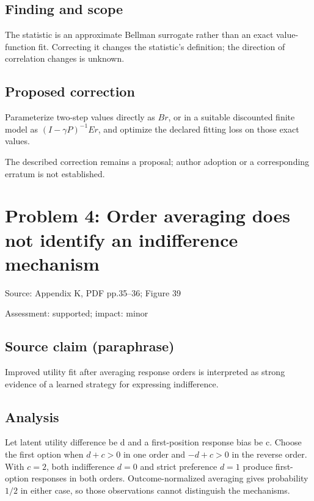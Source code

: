 \documentclass[11pt]{article}
\begin{document}
\subsection*{Finding and scope}

The statistic is an approximate Bellman surrogate rather than an exact value-function fit. Correcting it changes the statistic’s definition; the direction of correlation changes is unknown.

\subsection*{Proposed correction}

Parameterize two-step values directly as \(Br\), or in a suitable discounted finite model as \((I-\gamma P)^{-1}Er\), and optimize the declared fitting loss on those exact values.

The described correction remains a proposal; author adoption or a corresponding erratum is not established.

\section*{Problem 4: Order averaging does not identify an indifference mechanism}

Source: Appendix K, PDF pp.35–36; Figure 39

Assessment: supported; impact: minor

\subsection*{Source claim (paraphrase)}

Improved utility fit after averaging response orders is interpreted as strong evidence of a learned strategy for expressing indifference.

\subsection*{Analysis}

Let latent utility difference be d and a first-position response bias be c. Choose the first option when \(d+c>0\) in one order and \(-d+c>0\) in the reverse order. With \(c=2\), both indifference \(d=0\) and strict preference \(d=1\) produce first-option responses in both orders. Outcome-normalized averaging gives probability \(1/2\) in either case, so those observations cannot distinguish the mechanisms.
\end{document}
